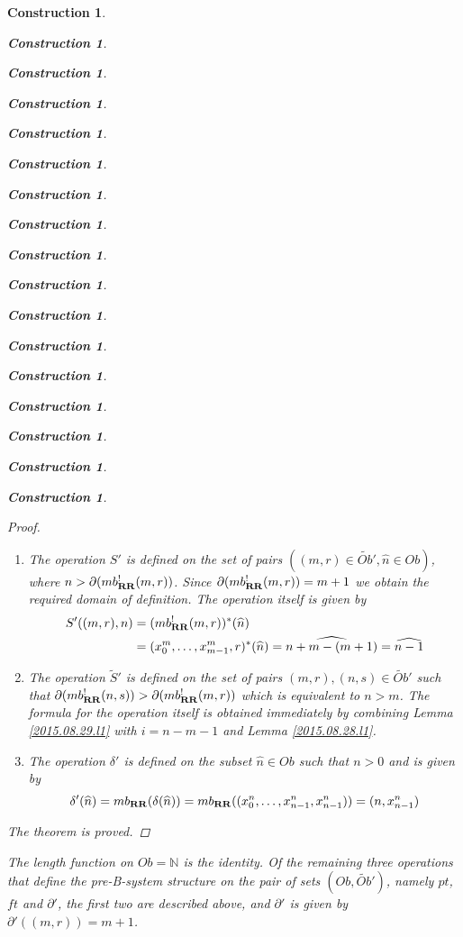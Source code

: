 \documentclass[onecolumn,12pt]{amsart}
\numberwithin{proposition}{subsection}
\newtheorem{construction}[proposition]{Construction}
\newcommand{\nn}{{\mathbb N}}
\newcommand{\nat}{\nn}
\newcommand{\wt}{\widetilde}
\newcommand{\wh}{\widehat}
\newcommand{\RR}{{\bf RR}}
\begin{document}
\begin{construction}
\begin{construction}
\begin{construction}
\begin{construction}
\begin{construction}
\begin{construction}
\begin{construction}
\begin{construction}
\begin{construction}
\begin{construction}
\begin{construction}
\begin{construction}
\begin{construction}
\begin{construction}
\begin{construction}
\begin{construction}
\begin{construction}
\begin{proof}
\begin{enumerate}
  $\partial(mb_{\RR}^!(n,s))>m-1$. Since $\partial(mb_{\RR}^!(n,s))=n+1$ we
  obtain the required domain of definition. The formula by the operation itself
  is obtained immediately by combining Lemma \ref{2015.08.29.l1} and Lemma
  \ref{2015.08.26.l3a}.
%
\item The operation $S'$ is defined on the set of pairs $((m,r)\in
  \wt{Ob}',\wh{n}\in Ob)$, where $n>\partial(mb_{\RR}^!(m,r))$. Since
  $\partial(mb_{\RR}^!(m,r))=m+1$ we obtain the required domain of
  definition. The operation itself is given by
  \begin{equation*}
    \begin{split}
      S'((m,r),n)&=(mb_{\RR}^!(m,r))^*(\wh{n})
      \\&=(x_0^m,\dots,x_{m-1}^m,r)^*(\wh{n})=\wh{n+m-(m+1)}=\wh{n-1}
    \end{split}
  \end{equation*}
\item The operation $\wt{S}'$ is defined on the set of pairs $(m,r),(n,s)\in
  \wt{Ob}'$ such that $\partial(mb_{\RR}^!(n,s))>\partial(mb_{\RR}^!(m,r))$
  which is equivalent to $n>m$. The formula for the operation itself is
  obtained immediately by combining Lemma \ref{2015.08.29.l1} with $i=n-m-1$
  and Lemma \ref{2015.08.28.l1}.
%
\item The operation $\delta'$ is defined on the subset $\wh{n}\in Ob$ such that
  $n>0$ and is given by
%
$$\delta'(\wh{n})=mb_{\RR}(\delta(\wh{n}))=mb_{\RR}((x_0^n,\dots,x_{n-1}^n,x_{n-1}^n))=(n,x_{n-1}^n)$$
%
\end{enumerate}
%
The theorem is proved. 
\end{proof}
%
The length function on $Ob=\nat$ is the identity. Of the remaining three
operations that define the pre-B-system structure on the pair of sets
$(Ob,\wt{Ob}')$, namely $pt$, $ft$ and $\partial'$, the first two are described above,
and $\partial'$ is given by $\partial'((m,r))=m+1$.


\end{construction}
\end{construction}
\end{construction}
\end{construction}
\end{construction}
\end{construction}
\end{construction}
\end{construction}
\end{construction}
\end{construction}
\end{construction}
\end{construction}
\end{construction}
\end{construction}
\end{construction}
\end{construction}
\end{construction}
\end{document}
